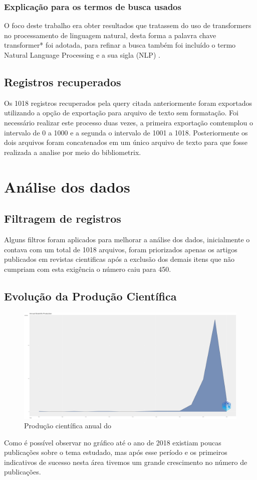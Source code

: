 \subsubsection{Explicação para os termos de busca usados}
O foco deste trabalho era obter resultados que tratassem do uso de transformers no processamento de linguagem natural, desta forma a palavra chave transformer* foi adotada, para refinar a busca também foi incluído o termo Natural Language Processing e a sua sigla (NLP) .

\subsection{Registros recuperados}
Os 1018 registros recuperados pela query citada anteriormente foram exportados utilizando a opção de exportação para arquivo de texto sem formatação. Foi necessário realizar este processo duas vezes, a primeira exportação comtemplou o intervalo de 0 a 1000 e a segunda o intervalo de 1001 a 1018. Posteriormente os dois arquivos foram concatenados em um único arquivo de texto para que fosse realizada a analise por meio do bibliometrix. 

\section{Análise dos dados}

\subsection{Filtragem de registros}
Alguns filtros foram aplicados para melhorar a análise dos dados, inicialmente o \dataset contava com um total de 1018 arquivos, foram priorizados apenas os artigos publicados em revistas cientificas após a exclusão dos demais itens que não cumpriam com esta exigência o número caiu para 450. 

\subsection{Evolução da Produção Científica}
\begin{figure}[ht]
    \centering
    \includegraphics[width=12cm]{experiments/DanielrCardoso/AnaliseBibliometrica/AnnualScientificProduction-2022-02-10.png}
    \caption{Produção científica anual do \dataset\ }
    \label{fig:evoDanielrCardoso}
\end{figure}
Como é possível observar no gráfico até o ano de 2018 existiam poucas publicações sobre o tema estudado, mas após esse período e os primeiros indicativos de sucesso nesta área tivemos um grande crescimento no número de publicações.

